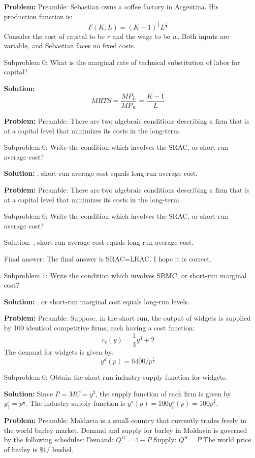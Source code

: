 \documentclass[10pt]{article}
\begin{document}
\textbf{Problem:}
Preamble: Sebastian owns a coffee factory in Argentina. His production function is:
\[
F(K, L)=(K-1)^{\frac{1}{4}} L^{\frac{1}{4}}
\]
Consider the cost of capital to be $r$ and the wage to be $w$. Both inputs are variable, and Sebastian faces no fixed costs.

Subproblem 0: What is the marginal rate of technical substitution of labor for capital?


\textbf{Solution:}
\[
M R T S=\frac{M P_{L}}{M P_{K}}=\boxed{\frac{K-1}{L}}
\]


\textbf{Problem:}
Preamble: There are two algebraic conditions describing a firm that is at a capital level that minimizes its costs in the long-term.

Subproblem 0: Write the condition which involves the SRAC, or short-run average cost?


\textbf{Solution:}
, short-run average cost equals long-run average cost.


\textbf{Problem:}
Preamble: There are two algebraic conditions describing a firm that is at a capital level that minimizes its costs in the long-term.

Subproblem 0: Write the condition which involves the SRAC, or short-run average cost?


Solution: , short-run average cost equals long-run average cost.

Final answer: The final answer is SRAC=LRAC. I hope it is correct.

Subproblem 1: Write the condition which involves SRMC, or short-run marginal cost?


\textbf{Solution:}
, or short-run marginal cost equals long-run levels.


\textbf{Problem:}
Preamble: Suppose, in the short run, the output of widgets is supplied by 100 identical competitive firms, each having a cost function:
\[
c_{s}(y)=\frac{1}{3} y^{3}+2
\]
The demand for widgets is given by:
\[
y^{d}(p)=6400 / p^{\frac{1}{2}}
\]

Subproblem 0: Obtain the short run industry supply function for widgets.


\textbf{Solution:}
Since $P=M C=y^{2}$, the supply function of each firm is given by $y_{i}^{s}=p^{\frac{1}{2}}$. 
The industry supply function is $y^{s}(p)=100 y_{i}^{s}(p)=\boxed{100 p^{\frac{1}{2}}}$.


\textbf{Problem:}
Preamble: Moldavia is a small country that currently trades freely in the world barley market. Demand and supply for barley in Moldavia is governed by the following schedules:
Demand: $Q^{D}=4-P$
Supply: $Q^{S}=P$
The world price of barley is $\$ 1 /$ bushel.
\end{document}
